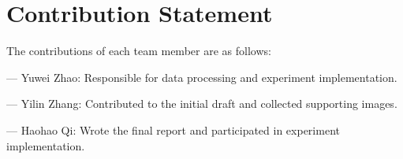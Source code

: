 \section{Contribution Statement}
The contributions of each team member are as follows:
    
— Yuwei Zhao: Responsible for data processing and experiment implementation.

— Yilin Zhang: Contributed to the initial draft and collected supporting images.

— Haohao Qi: Wrote the final report and participated in experiment implementation.
